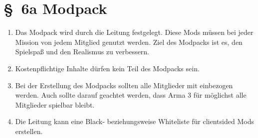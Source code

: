 \newpage
\section*{\S~6a Modpack} 
\label{sec:modpack}

\begin{enumerate}[label=(\arabic*)]
    \item Das Modpack wird durch die Leitung festgelegt. Diese Mods müssen bei jeder Mission von jedem Mitglied genutzt werden. Ziel des Modpacks ist es, den Spielspaß und den Realismus zu verbessern.    
    \item Kostenpflichtige Inhalte dürfen kein Teil des Modpacks sein.    
    \item Bei der Erstellung des Modpacks sollten alle Mitglieder mit einbezogen werden. Auch sollte darauf geachtet werden, dass Arma 3 für möglichst alle Mitglieder spielbar bleibt.    
    \item Die Leitung kann eine Black- beziehungsweise Whiteliste für clientsided Mods erstellen.
\end{enumerate}
